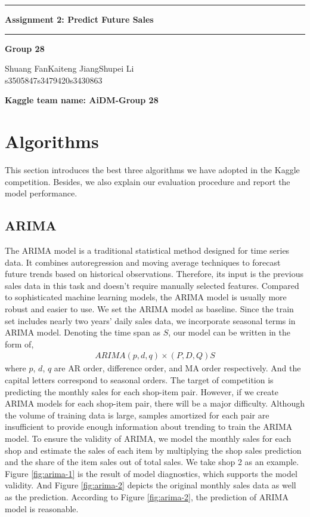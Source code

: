 \documentclass{article}
\begin{document}
\noindent\rule{\textwidth}{1pt}
\begin{center}
    \LARGE \textbf{Assignment 2: Predict Future Sales}
\end{center}
\noindent\rule{\textwidth}{0.5pt}
\begin{center}
    \textbf{Group 28}\par
    \vspace{0.3cm}
Shuang Fan\phantom{space}Kaiteng Jiang\phantom{space}Shupei Li\\
s3505847\phantom{spacespac}s3479420\phantom{spacespa}s3430863
\end{center}
\textbf{Kaggle team name: AiDM-Group 28}

\section{Algorithms}
This section introduces the best three algorithms we have adopted in the Kaggle competition. Besides, we also explain our evaluation procedure and report the model performance.
\subsection{ARIMA}
The ARIMA model is a traditional statistical method designed for time series data. It combines autoregression and moving average techniques to forecast future trends based on historical observations. Therefore, its input is the previous sales data in this task and doesn't require manually selected features. Compared to sophisticated machine learning models, the ARIMA model is usually more robust and easier to use. We set the ARIMA model as baseline. Since the train set includes nearly two years' daily sales data, we incorporate seasonal terms in ARIMA model. Denoting the time span as $S$, our model can be written in the form of,
\begin{align*}
    ARIMA\left( p, d, q \right) \times\left( P, D, Q \right) S
\end{align*}
where $p$, $d$, $q$ are AR order, difference order, and MA order respectively. And the capital letters correspond to seasonal orders. The target of competition is predicting the monthly sales for each shop-item pair. However, if we create ARIMA models for each shop-item pair, there will be a major difficulty. Although the volume of training data is large, samples amortized for each pair are insufficient to provide enough information about trending to train the ARIMA model. To ensure the validity of ARIMA, we model the monthly sales for each shop and estimate the sales of each item by multiplying the shop sales prediction and the share of the item sales out of total sales. We take shop 2 as an example. Figure \ref{fig:arima-1} is the result of model diagnostics, which supports the model validity. And Figure \ref{fig:arima-2} depicts the original monthly sales data as well as the prediction. According to Figure \ref{fig:arima-2}, the prediction of ARIMA model is reasonable.\par
\end{document}
